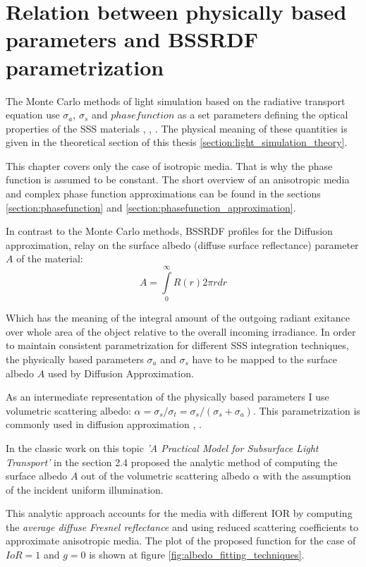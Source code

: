 \section{Relation between physically based parameters and BSSRDF parametrization}
\label{section:cb_parametrization}
The Monte Carlo methods of light simulation based on the radiative transport equation use
$\sigma_a$, $\sigma_s$ and $phase function$ as a set parameters defining the optical properties of
the SSS materials \cite{chandrasekhar1960radiative}, \cite{pharr2010physically},
\cite{Jensen:2001:PMS:383259.383319}. The physical meaning of these quantities is given in the
theoretical section of this thesis \ref{section:light_simulation_theory}.

This chapter covers only the case of isotropic media. That is why the phase function is assumed to
be constant. The short overview of an anisotropic media and complex phase function approximations
can be found in the sections \ref{section:phasefunction} and
\ref{section:phasefunction_approximation}.

In contrast to the Monte Carlo methods, BSSRDF profiles for the Diffusion approximation, relay on
the surface albedo (diffuse surface reflectance) parameter $A$ of the material:
\[ A = \int\limits_0^\infty R(r)2\pi r dr \]

Which has the meaning of the integral amount of the outgoing radiant exitance over whole area of the
object relative to the overall incoming irradiance. In order to maintain consistent parametrization
for different SSS integration techniques, the physically based parameters $\sigma_a$ and $\sigma_s$
have to be mapped to the surface albedo $A$ used by Diffusion Approximation.

As an intermediate representation of the physically based parameters I use volumetric scattering
albedo: $\alpha = \sigma_s/\sigma_t = \sigma_s/(\sigma_s + \sigma_a)$. This parametrization is
commonly used in diffusion approximation \cite{Jensen:2002:RHR:566570.566619},
\cite{Donner:2009:EBM}.

In the classic work on this topic \emph{'A Practical Model for Subsurface Light Transport'} in the
section 2.4 \cite{Jensen:2001:PMS:383259.383319} proposed the analytic method of computing the
surface albedo $A$ out of the volumetric scattering albedo $\alpha$ with the assumption of the
incident uniform illumination.

This analytic approach accounts for the media with different \gls{IOR} by computing the
\emph{average diffuse Fresnel reflectance} and using reduced scattering coefficients to approximate
anisotropic media. The plot of the proposed function for the case of $IoR=1$ and $g=0$ is shown at
figure \ref{fig:albedo_fitting_techniques}.

